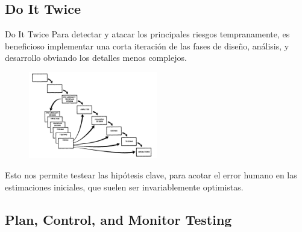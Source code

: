 \documentclass{beamer}
\begin{document}
\subsection{Do It Twice}
\begin{frame}{Do It Twice}
Para detectar y atacar los principales riesgos tempranamente, es beneficioso implementar una corta iteración de las fases de diseño, análisis, y desarrollo obviando los detalles menos complejos.

\begin{figure}
\includegraphics[width=0.5\textwidth]{figures/hazloDosVeces.png}
\end{figure}

Esto nos permite testear las hipótesis clave, para acotar el error humano en las estimaciones iniciales, que suelen ser invariablemente optimistas.

\end{frame}

\subsection{Plan, Control, and Monitor Testing}
\end{document}
